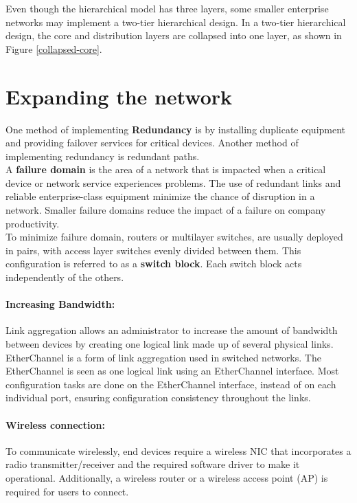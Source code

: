 Even though the hierarchical model has three layers, some smaller enterprise networks may implement a two-tier hierarchical design. In a two-tier hierarchical design, the core and distribution layers are collapsed into one layer, as shown in Figure \ref{collapsed-core}.

\section{Expanding the network}

One method of implementing \textbf{Redundancy} is by installing duplicate equipment and providing failover services for critical devices. Another method of implementing redundancy is redundant paths.\\

A \textbf{failure domain} is the area of a network that is impacted when a critical device or network service experiences problems. The use of redundant links and reliable enterprise-class equipment minimize the chance of disruption in a network. Smaller failure domains reduce the impact of a failure on company productivity.\\

To minimize failure domain, routers or multilayer switches, are usually deployed in pairs, with access layer switches evenly divided between them. This configuration is referred to as a \textbf{switch block}. Each switch block acts independently of the others.

\paragraph{Increasing Bandwidth:} Link aggregation allows an administrator to increase the amount of bandwidth between devices by creating one logical link made up of several physical links. EtherChannel is a form of link aggregation used in switched networks. The EtherChannel is seen as one logical link using an EtherChannel interface. Most configuration tasks are done on the EtherChannel interface, instead of on each individual port, ensuring configuration consistency throughout the links.

\paragraph{Wireless connection:} To communicate wirelessly, end devices require a wireless NIC that incorporates a radio transmitter/receiver and the required software driver to make it operational. Additionally, a wireless router or a wireless access point (AP) is required for users to connect.


